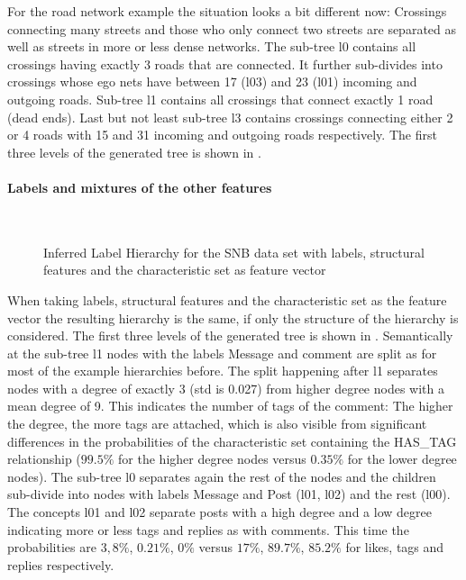 For the road network example the situation looks a bit different now: Crossings connecting many streets and those who only connect two streets are separated as well as streets in more or less dense networks. The sub-tree l0 contains all crossings having exactly 3 roads that are connected. It further sub-divides into crossings whose ego nets have between 17 (l03) and 23 (l01) incoming and outgoing roads. Sub-tree l1 contains all crossings that connect exactly 1 road (dead ends). Last but not least sub-tree l3 contains crossings connecting either 2 or 4 roads with 15 and 31 incoming and outgoing roads respectively. The first three levels of the generated tree is shown in .


\paragraph{Labels and mixtures of the other features}
\begin{figure}[htp]
    \centering
     \\
    \caption{Inferred Label Hierarchy for the SNB data set with labels, structural features and the characteristic set as feature vector}
    \label{fig:lscldbctree}
\end{figure}{}
When taking labels, structural features and the characteristic set as the feature vector the resulting hierarchy is the same, if only the structure of the hierarchy is considered. The first three levels of the generated tree is shown in . Semantically at the sub-tree l1 nodes with the labels Message and comment are split as for most of the example hierarchies before. The split happening after l1 separates nodes with a degree of exactly 3 (std is 0.027) from higher degree nodes with a mean degree of 9. This indicates the number of tags of the comment: The higher the degree, the more tags are attached, which is also visible from significant differences in the probabilities of the characteristic set containing the HAS\_TAG relationship ($99.5\%$ for the higher degree nodes versus $0.35\%$ for the lower degree nodes). The sub-tree l0 separates again the rest of the nodes and the children sub-divide into nodes with labels Message and Post (l01, l02) and the rest (l00). The concepts l01 and l02 separate posts with a high degree and a low degree indicating more or less tags and replies as with comments. This time the probabilities are $3,8\%$, $0.21\%$, $0\%$ versus $17\%$, $89.7\%$, $85.2\%$ for likes, tags and replies respectively. \\


